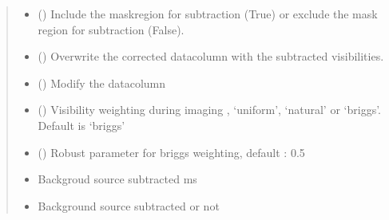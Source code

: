 \documentclass[letterpaper,10pt,english]{sphinxmanual}
\begin{document}
\begin{fulllineitems}
\begin{fulllineitems}
\begin{quote}
\begin{description}
\begin{itemize}
\item {} 
\sphinxAtStartPar
{} () \textendash{} Include the maskregion for subtraction (True) or exclude the mask region for subtraction (False).

\item {} 
\sphinxAtStartPar
{} () \textendash{} Overwrite the corrected datacolumn with the subtracted visibilities.

\item {} 
\sphinxAtStartPar
{} () \textendash{} Modify the datacolumn

\item {} 
\sphinxAtStartPar
{} () \textendash{} Visibility weighting during imaging , ‘uniform’, ‘natural’ or ‘briggs’. Default is ‘briggs’

\item {} 
\sphinxAtStartPar
{} () \textendash{} Robust parameter for briggs weighting, default : 0.5

\end{itemize}

\item[{Returns}] \leavevmode
\sphinxAtStartPar
\begin{itemize}
\item {} 
\sphinxAtStartPar
{} \textendash{} Backgroud source subtracted ms

\item {} 
\sphinxAtStartPar
{} \textendash{} Background source subtracted or not

\end{itemize}


\end{description}\end{quote}

\end{fulllineitems}



\end{fulllineitems}
\end{document}
